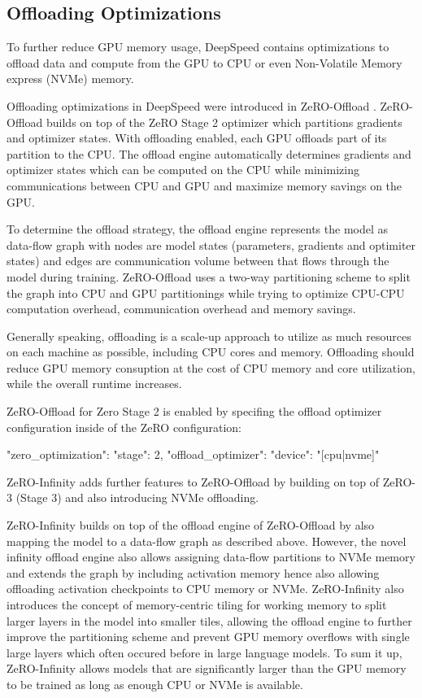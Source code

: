 \subsection{Offloading Optimizations}
\label{subsection:offloading}

To further reduce GPU memory usage, DeepSpeed contains optimizations to offload 
data and compute from the GPU to CPU or even Non-Volatile Memory express (NVMe) 
memory. 

Offloading optimizations in DeepSpeed were introduced in ZeRO-Offload 
\cite*{DBLP:journals/corr/abs-2101-06840}. ZeRO-Offload builds on top of 
the ZeRO Stage 2 optimizer which partitions gradients and optimizer states. 
With offloading enabled, each GPU offloads part of its partition to the CPU. 
The offload engine automatically determines gradients and optimizer states 
which can be computed on the CPU while minimizing communications between CPU 
and GPU and maximize memory savings on the GPU.

To determine the offload strategy, the offload engine represents the model as 
data-flow graph with nodes are model states (parameters, gradients and 
optimiter states) and edges are communication volume between that flows through 
the model during training. ZeRO-Offload uses a two-way partitioning scheme to 
split the graph into CPU and GPU partitionings while trying to optimize CPU-CPU 
computation overhead, communication overhead and memory savings. 

Generally speaking, offloading is a scale-up approach to utilize as much 
resources on each machine as possible, including CPU cores and memory. 
Offloading should reduce GPU memory consuption at the cost of CPU memory and 
core utilization, while the overall runtime increases.

ZeRO-Offload for Zero Stage 2 is enabled by specifing the offload optimizer 
configuration inside of the ZeRO configuration:

\begin{json}
"zero_optimization": {
    "stage": 2,
    "offload_optimizer": {
        "device": "[cpu|nvme]"
    }
}
\end{json}

ZeRO-Infinity \cite*{DBLP:journals/corr/abs-2104-07857} adds further features to 
ZeRO-Offload by building on top of ZeRO-3 (Stage 3) and also introducing NVMe 
offloading.

ZeRO-Infinity builds on top of the offload engine of ZeRO-Offload by also 
mapping the model to a data-flow graph as described above. However, the 
novel infinity offload engine also allows assigning data-flow partitions 
to NVMe memory and extends the graph by including activation memory hence 
also allowing offloading activation checkpoints to CPU memory or NVMe. 
ZeRO-Infinity also introduces the concept of memory-centric tiling for 
working memory to split larger layers in the model into smaller tiles, 
allowing the offload engine to further improve the partitioning scheme and 
prevent GPU memory overflows with single large layers which often occured 
before in large language models.   To sum it up, ZeRO-Infinity allows 
models that are significantly larger than the GPU memory to be trained as 
long as enough CPU or NVMe is available. 

